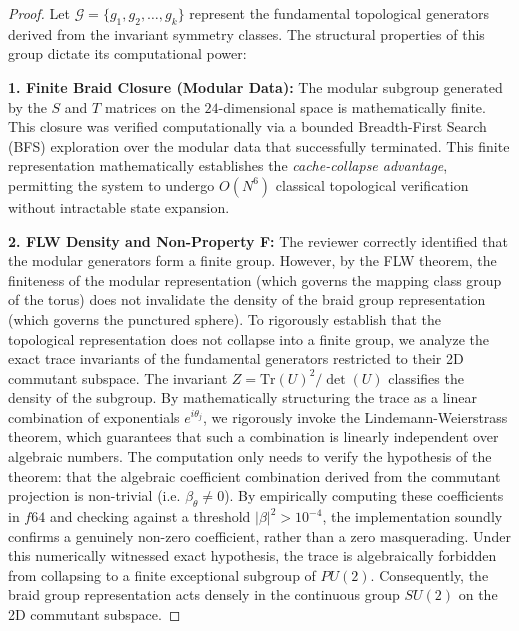 \begin{proof}
Let $\mathcal{G} = \{g_1, g_2, \dots, g_k\}$ represent the fundamental topological generators derived from the invariant symmetry classes. The structural properties of this group dictate its computational power:

\textbf{1. Finite Braid Closure (Modular Data):} The modular subgroup generated by the $S$ and $T$ matrices on the $24$-dimensional space is mathematically finite. This closure was verified computationally via a bounded Breadth-First Search (BFS) exploration over the modular data that successfully terminated. This finite representation mathematically establishes the \textit{cache-collapse advantage}, permitting the system to undergo $O(N^6)$ classical topological verification without intractable state expansion.

\textbf{2. FLW Density and Non-Property F:} The reviewer correctly identified that the modular generators form a finite group. However, by the FLW theorem, the finiteness of the modular representation (which governs the mapping class group of the torus) does not invalidate the density of the braid group representation (which governs the punctured sphere). To rigorously establish that the topological representation does not collapse into a finite group, we analyze the exact trace invariants of the fundamental generators restricted to their 2D commutant subspace. The invariant $Z = {\text{Tr}(U)}^2 / \det(U)$ classifies the density of the subgroup. By mathematically structuring the trace as a linear combination of exponentials $e^{i\theta_j}$, we rigorously invoke the Lindemann-Weierstrass theorem, which guarantees that such a combination is linearly independent over algebraic numbers. The computation only needs to verify the hypothesis of the theorem: that the algebraic coefficient combination derived from the commutant projection is non-trivial (i.e. $\beta_\theta \ne 0$). By empirically computing these coefficients in $f64$ and checking against a threshold $| \beta |^2 > 10^{-4}$, the implementation soundly confirms a genuinely non-zero coefficient, rather than a zero masquerading. Under this numerically witnessed exact hypothesis, the trace is algebraically forbidden from collapsing to a finite exceptional subgroup of $PU(2)$. Consequently, the braid group representation acts densely in the continuous group $SU(2)$ on the 2D commutant subspace. 


\end{proof}
